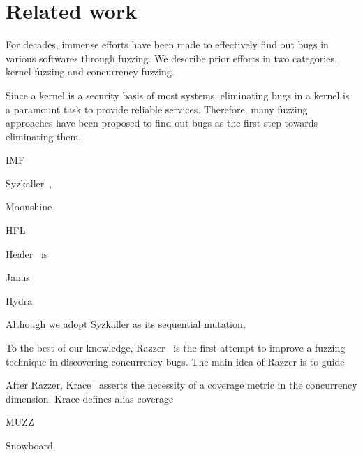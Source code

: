 \section{Related work}
\label{s:relwk}

For decades, immense efforts have been made to effectively find out
bugs in various softwares through fuzzing. We describe prior efforts
in two categories, kernel fuzzing and concurrency fuzzing.

%
Since a kernel is a security basis of most systems, eliminating bugs
in a kernel is a paramount task to provide reliable
services. Therefore, many fuzzing approaches have been proposed to
find out bugs as the first step towards eliminating them.
%

IMF~\cite{imf}

Syzkaller~\cite{syzkaller},

Moonshine~\cite{moonshine}

HFL~\cite{hfl}

Healer~\cite{healer} is

Janus~\cite{janus}

Hydra~\cite{hydra}


Although we adopt Syzkaller as its sequential mutation, 

%
To the best of our knowledge, Razzer~\cite{razzer} is the first
attempt to improve a fuzzing technique in discovering concurrency
bugs.
%
The main idea of Razzer is to guide


After Razzer, Krace~\cite{krace} asserts the necessity of a coverage
metric in the concurrency dimension. Krace defines alias coverage


MUZZ~\cite{muzz}


Snowboard~\cite{snowboard}



